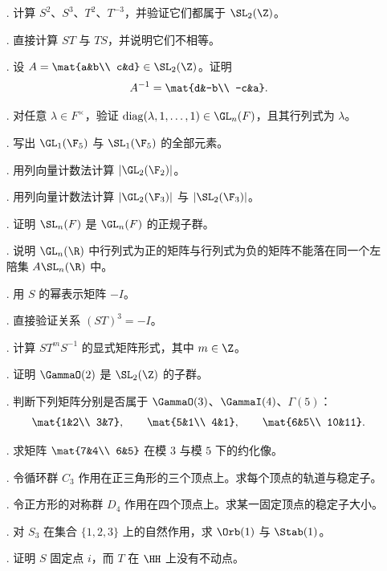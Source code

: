 \begin{enumerate}
  \item[\basic 1.] 计算 $S^2$、$S^3$、$T^2$、$T^{-3}$，并验证它们都属于 $\SL_2(\Z)$。
  \item[\basic 2.] 直接计算 $ST$ 与 $TS$，并说明它们不相等。
  \item[\basic 3.] 设 $A=\mat{a&b\\ c&d}\in \SL_2(\Z)$。证明
  \[
  A^{-1}=\mat{d&-b\\ -c&a}.
  \]
  \item[\basic 4.] 对任意 $\lambda\in F^\times$，验证 $\operatorname{diag}(\lambda,1,\dots,1)\in \GL_n(F)$，且其行列式为 $\lambda$。
  \item[\basic 5.] 写出 $\GL_1(\F_5)$ 与 $\SL_1(\F_5)$ 的全部元素。
  \item[\basic 6.] 用列向量计数法计算 $|\GL_2(\F_2)|$。
  \item[\basic 7.] 用列向量计数法计算 $|\GL_2(\F_3)|$ 与 $|\SL_2(\F_3)|$。
  \item[\basic 8.] 证明 $\SL_n(F)$ 是 $\GL_n(F)$ 的正规子群。
  \item[\basic 9.] 说明 $\GL_n(\R)$ 中行列式为正的矩阵与行列式为负的矩阵不能落在同一个左陪集 $A\SL_n(\R)$ 中。
  \item[\basic 10.] 用 $S$ 的幂表示矩阵 $-I$。
  \item[\basic 11.] 直接验证关系 $(ST)^3=-I$。
  \item[\basic 12.] 计算 $ST^mS^{-1}$ 的显式矩阵形式，其中 $m\in\Z$。
  \item[\basic 13.] 证明 $\GammaO(2)$ 是 $\SL_2(\Z)$ 的子群。
  \item[\basic 14.] 判断下列矩阵分别是否属于 $\GammaO(3)$、$\GammaI(4)$、$\Gamma(5)$：
  \[
  \mat{1&2\\ 3&7},\qquad \mat{5&1\\ 4&1},\qquad \mat{6&5\\ 10&11}.
  \]
  \item[\basic 15.] 求矩阵 $\mat{7&4\\ 6&5}$ 在模 $3$ 与模 $5$ 下的约化像。
  \item[\basic 16.] 令循环群 $C_3$ 作用在正三角形的三个顶点上。求每个顶点的轨道与稳定子。
  \item[\basic 17.] 令正方形的对称群 $D_4$ 作用在四个顶点上。求某一固定顶点的稳定子大小。
  \item[\basic 18.] 对 $S_3$ 在集合 $\{1,2,3\}$ 上的自然作用，求 $\Orb(1)$ 与 $\Stab(1)$。
  \item[\basic 19.] 证明 $S$ 固定点 $i$，而 $T$ 在 $\HH$ 上没有不动点。

\end{enumerate}
